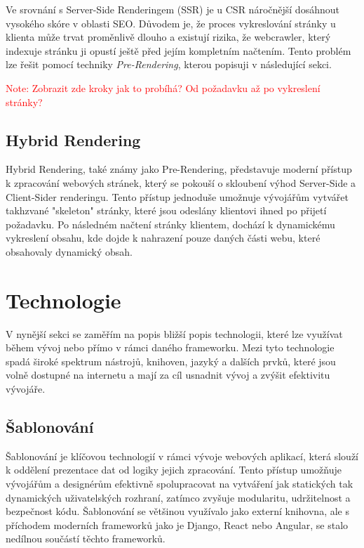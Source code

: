 Ve srovnání s Server-Side Renderingem (SSR) je u CSR náročnější dosáhnout vysokého skóre v oblasti SEO. Důvodem je, že proces vykreslování stránky u klienta může trvat proměnlivě dlouho a existují rizika, že webcrawler, který indexuje stránku ji opustí ještě před jejím kompletním načtením. Tento problém lze řešit pomocí techniky \textit{Pre-Rendering}, kterou popisuji v následující sekci.

\textcolor{red}{Note: Zobrazit zde kroky jak to probíhá? Od požadavku až po vykreslení stránky?}

\subsection{Hybrid Rendering}
\label{subsec:dev-request-processing-hybrid-rendering}
Hybrid Rendering, také známy jako Pre-Rendering, představuje moderní přístup k zpracování webových stránek, který se pokouší o skloubení výhod Server-Side a Client-Sider renderingu. Tento přístup jednoduše umožnuje vývojářům vytvářet takhzvané "skeleton" stránky, které jsou odeslány klientovi ihned po přijetí požadavku. Po následném načtení stránky klientem, dochází k dynamickému vykreslení obsahu, kde dojde k nahrazení pouze daných části webu, které obsahovaly dynamický obsah.

\section{Technologie}
\label{sec:dev-technology}
V nynější sekci se zaměřím na popis bližší popis technologii, které lze využívat během vývoj nebo přímo v rámci daného frameworku. Mezi tyto technologie spadá široké spektrum nástrojů, knihoven, jazyký a dalších prvků, které jsou volně dostupné na internetu a mají za cíl usnadnit vývoj a zvýšit efektivitu vývojáře.

\subsection{Šablonování}
\label{subsec:dev-technology-templating}
Šablonování je klíčovou technologií v rámci vývoje webových aplikací, která slouží k oddělení prezentace dat od logiky jejich zpracování. Tento přístup umožňuje vývojářům a designérům efektivně spolupracovat na vytváření jak statických tak dynamických uživatelských rozhraní, zatímco zvyšuje modularitu, udržitelnost a bezpečnost kódu. Šablonování se většinou využívalo jako externí knihovna, ale s příchodem moderních frameworků jako je Django, React nebo Angular, se stalo nedílnou součástí těchto frameworků.

